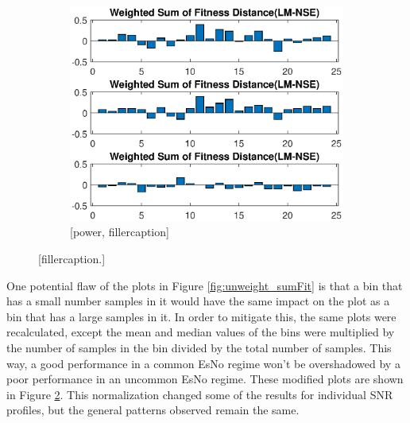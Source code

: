 \begin{figure}[ht!]
\begin{center}
\begin{subfigure}{0.55\linewidth}
	\centering
	\includegraphics[scale=0.6]{figures/c_sim_results/power_weighted_sumFitness.eps}
	\caption{[power, fillercaption]}
	\label{fig:cSimWeightPower}
\end{subfigure}
\end{center}
\caption{[fillercaption.]}
\label{fig:weight_sumFit}
\end{figure}

\par One potential flaw of the plots in Figure \ref{fig:unweight_sumFit} is that a bin that has a small number samples in it would have the same impact on the plot as a bin that has a large samples in it. In order to mitigate this, the same plots were recalculated, except the mean and median values of the bins were multiplied by the number of samples in the bin divided by the total number of samples. This way, a good performance in a common EsNo regime won't be overshadowed by a poor performance in an uncommon EsNo regime. These modified plots are shown in Figure \ref{fig:weight_sumFit}. This normalization changed some of the results for individual SNR profiles, but the general patterns observed remain the same.

\clearpage
